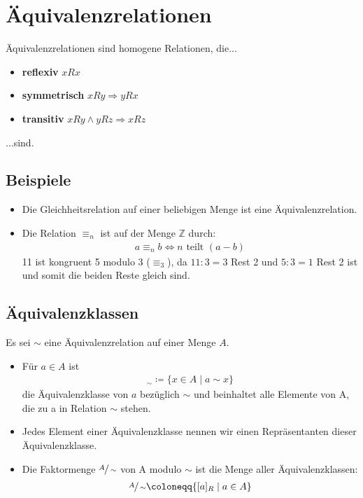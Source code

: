 \section{Äquivalenzrelationen}
Äquivalenzrelationen sind homogene Relationen, die...
\begin{itemize}
    \item \textbf{reflexiv} $xRx$
    \item \textbf{symmetrisch} $xRy \Rightarrow yRx$
    \item \textbf{transitiv} $xRy \wedge yRz \Rightarrow xRz$
\end{itemize}
...sind.
\subsection{Beispiele}
\begin{itemize}
    \item Die Gleichheitsrelation auf einer beliebigen Menge ist eine
    Äquivalenzrelation.
    \item Die Relation $\equiv_n$ ist auf der Menge $\mathbb{Z}$ durch:
    \begin{align*}
        a \equiv_n b \Leftrightarrow n \text{ teilt } (a - b)  
    \end{align*}
    11 ist kongruent 5 modulo 3 ($\equiv_3$), da $11 : 3 = 3$  Rest  2 
    und $5 : 3 = 1$  Rest  2 ist und somit die beiden Reste gleich sind.
\end{itemize}
\subsection{Äquivalenzklassen}
Es sei $\sim$ eine Äquivalenzrelation auf einer Menge $A$. 
\begin{itemize}
    \item Für $a \in A$ ist
    \begin{align*}
        [a]_{\sim} \coloneqq \{x \in A \mid a \sim x\}
    \end{align*}
    die Äquivalenzklasse von $a$ bezüglich $\sim$ und beinhaltet alle Elemente von A, die zu a in Relation
    $\sim$ stehen.
    \item Jedes Element einer Äquivalenzklasse nennen wir einen
    Repräsentanten dieser Äquivalenzklasse.
    \item Die Faktormenge $\sfrac{A}{\sim}$ von A modulo $\sim$ ist die Menge aller Äquivalenzklassen:
    \begin{align*}
        \sfrac{A}{\sim} \coloneqq \{[a]_{R} \mid a \in A\}
    \end{align*}
\end{itemize}
